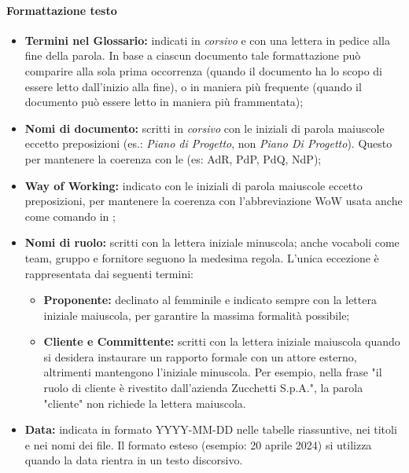 \paragraph{Formattazione testo}
\begin{itemize}
  \item \textbf{Termini nel Glossario:} indicati in \textit{corsivo} e con una lettera  in pedice alla fine della parola. In base a ciascun documento tale formattazione può comparire alla sola prima occorrenza (quando il documento ha lo scopo di essere letto dall'inizio alla fine), o in maniera più frequente (quando il documento può essere letto in maniera più frammentata);
  \item \textbf{Nomi di documento:} scritti in \textit{corsivo} con le iniziali di parola maiuscole eccetto preposizioni (es.: \textit{Piano di Progetto}, non \textit{Piano Di Progetto}). Questo per mantenere la coerenza con le  (es: AdR, PdP, PdQ, NdP);
  \item \textbf{Way of Working:} indicato con le iniziali di parola maiuscole eccetto preposizioni, per mantenere la coerenza con l'abbreviazione WoW usata anche come comando in ;
  \item \textbf{Nomi di ruolo:} scritti con la lettera iniziale minuscola; anche vocaboli come team, gruppo e fornitore seguono la medesima regola. L'unica eccezione è rappresentata dai seguenti termini:
  \begin{itemize}
    \item \textbf{Proponente:} declinato al femminile e indicato sempre con la lettera iniziale maiuscola, per garantire la massima formalità possibile;
    \item \textbf{Cliente e Committente:} scritti con la lettera iniziale maiuscola quando si desidera instaurare un rapporto formale con un attore esterno, altrimenti mantengono l'iniziale minuscola. Per esempio, nella frase "il ruolo di cliente è rivestito dall'azienda Zucchetti S.p.A.", la parola "cliente" non richiede la lettera maiuscola.
  \end{itemize}
  \item \textbf{Data:} indicata in formato YYYY-MM-DD nelle tabelle riassuntive, nei titoli e nei nomi dei file. Il formato esteso (esempio: 20 aprile 2024) si utilizza quando la data rientra in un testo discorsivo.
\end{itemize}

